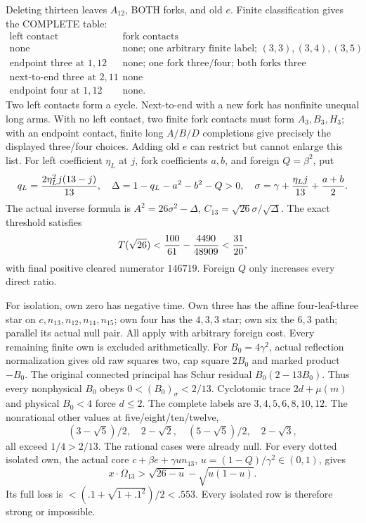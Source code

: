 \documentclass[11pt]{article}
\begin{document}
Deleting thirteen leaves \(A_{12}\), BOTH forks,
and old \(e\).
Finite classification gives the COMPLETE table:
\[
\begin{array}{c|l}
 \text{left contact}&\text{fork contacts}\\ \hline
 \text{none}&
 \text{none; one arbitrary finite label; }
                 (3,3),(3,4),(3,5)\\
 \text{endpoint three at }1,12&
 \text{none; one fork three/four; both forks three}\\
 \text{next-to-end three at }2,11&\text{none}\\
 \text{endpoint four at }1,12&\text{none}.
\end{array}
\]
Two left contacts form a cycle.
Next-to-end with a new fork has nonfinite unequal
long arms.
With no left contact, two finite fork contacts must
form \(A_3,B_3,H_3\); with an endpoint contact,
finite long \(A/B/D\) completions give precisely the
displayed three/four choices.
Adding old \(e\) can restrict but cannot enlarge this list.
For left coefficient \(\eta_L\) at \(j\), fork
coefficients \(a,b\), and foreign \(Q=\beta^2\), put
\[
 q_L={2\eta_L^2j(13-j)\over13},\quad
 \Delta=1-q_L-a^2-b^2-Q>0,\quad
 \sigma=\gamma+{\eta_Lj\over13}+{a+b\over2}.
\]
The actual inverse formula is
\(A^2=26\sigma^2-\Delta\),
\(C_{13}=\sqrt{26}\sigma/\sqrt\Delta\).
The exact threshold satisfies
\[
 T(\sqrt{26})<{100\over61}-{4490\over48909}<{31\over20},
\]
with final positive cleared numerator \(146719\).
Foreign \(Q\) only increases every direct ratio.

For isolation, own zero has negative time.
Own three has the affine four-leaf-three star on
\(c,n_{13},n_{12},n_{14},n_{15}\);
own four has the \(4,3,3\) star; own six the \(6,3\)
path; parallel its actual null pair.
All apply with arbitrary foreign cost.
Every remaining finite own is excluded arithmetically.
For \(B_0=4\gamma^2\), actual reflection normalization
gives old raw squares two, cap square \(2B_0\) and
marked product \(-B_0\).
The original connected principal has Schur residual
\(B_0(2-13B_0)\).
Thus every nonphysical \(B_0\) obeys
\(0<(B_0)_\sigma<2/13\).
Cyclotomic trace \(2d+\mu(m)\) and physical \(B_0<4\)
force \(d\le2\).
The complete labels are \(3,4,5,6,8,10,12\).
The nonrational other values at five/eight/ten/twelve,
\[
 (3-\sqrt5)/2,\quad2-\sqrt2,\quad
 (5-\sqrt5)/2,\quad2-\sqrt3,
\]
all exceed \(1/4>2/13\).
The rational cases were already null.
For every dotted isolated own, the actual core
\(c+\beta e+\gamma u n_{13}\),
\(u=(1-Q)/\gamma^2\in(0,1)\), gives
\[
 x\cdot\Omega_{13}>
           \sqrt{26-u}-\sqrt{u(1-u)}.
\]
Its full loss is \(<(.1+\sqrt{1+.1^2})/2<.553\).
Every isolated row is therefore strong or impossible.
\end{document}
